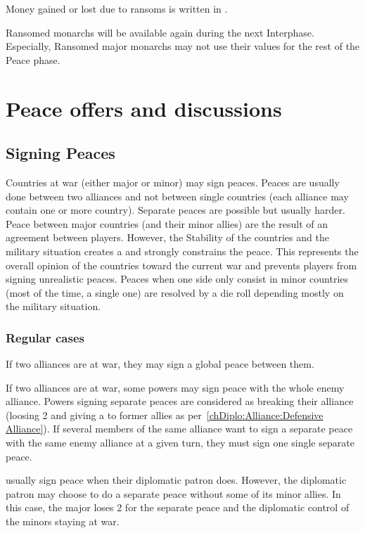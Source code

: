 \aparag Money gained or lost due to ransoms is written in .

\bparag Ransomed monarchs will be available again during the next Interphase.
\bparag Especially, Ransomed major monarchs may not use their values for the
rest of the Peace phase.

\section{Peace offers and discussions}\label{chPeace:Peace offers}
\subsection{Signing Peaces}
Countries at war (either major or minor) may sign peaces. Peaces are usually
done between two alliances and not between single countries (each alliance may
contain one or more country). Separate peaces are possible but usually
harder. Peace between major countries (and their minor allies) are the result
of an agreement between players. However, the Stability of the countries and
the military situation creates a  and strongly
constrains the peace. This represents the overall opinion of the countries
toward the current war and prevents players from signing unrealistic
peaces. Peaces when one side only consist in minor countries (most of the
time, a single one) are resolved by a die roll depending mostly on the
military situation.

\subsubsection{Regular cases}
 If two alliances are at war, they may sign a global
peace between them.

 If two alliances are at war, some
powers may sign peace with the whole enemy alliance.
\bparag Powers signing separate peaces are considered as breaking their
alliance (loosing 2 \STAB and giving a \CB to former allies as
per~\ref{chDiplo:Alliance:Defensive Alliance}).
\bparag If several members of the same alliance want to sign a separate peace
with the same enemy alliance at a given turn, they must sign one single
separate peace.

 usually sign peace when their diplomatic patron does.
\bparag However, the diplomatic patron may choose to do a separate peace
without some of its minor allies. In this case, the major loses 2 \STAB for
the separate peace and the diplomatic control of the minors staying at war.

